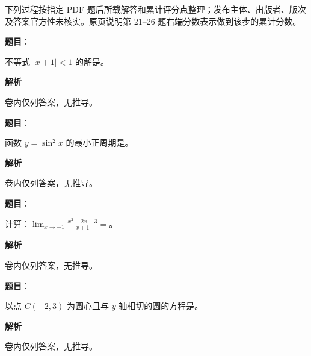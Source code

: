 

\begin{gktip}
下列过程按指定 PDF 题后所载解答和累计评分点整理；发布主体、出版者、版次及答案官方性未核实。原页说明第 21–26 题右端分数表示做到该步的累计分数。
\end{gktip}


\begin{answer}

\textbf{题目}：

不等式 $|x+1|<1$ 的解是\gkblank{}。

\textbf{解析}

卷内仅列答案，无推导。


\end{answer}
\begin{answer}

\textbf{题目}：

函数 $y=\sin^2 x$ 的最小正周期是\gkblank{}。

\textbf{解析}

卷内仅列答案，无推导。


\end{answer}
\begin{answer}

\textbf{题目}：

计算：$\displaystyle\lim_{x\to-1}\frac{x^2-2x-3}{x+1}=$\gkblank{}。

\textbf{解析}

卷内仅列答案，无推导。


\end{answer}
\begin{answer}

\textbf{题目}：

以点 $C(-2,3)$ 为圆心且与 $y$ 轴相切的圆的方程是\gkblank{}。

\textbf{解析}

卷内仅列答案，无推导。


\end{answer}
